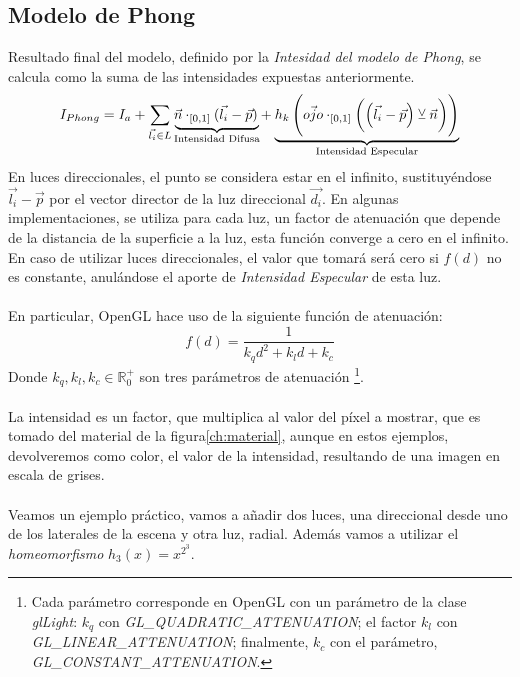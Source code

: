 \subsection{Modelo de Phong}
Resultado final del modelo, definido por la \textit{Intesidad del modelo de Phong}, se calcula como la suma de las intensidades expuestas anteriormente.
\[I_{Phong}=I_a+\sum_{\Vec{l_i}\in L} \mathrlap{\underbrace{\phantom{\Vec{n}\cdot_{[0, 1]}(\Vec{l_i}-\Vec{p})}}_{\text{Intensidad Difusa}}}\Vec{n}\cdot_{[0, 1]}(\Vec{l_i}-\Vec{p}) + \mathrlap{\underbrace{\phantom{h_k\left(\Vec{ojo}\cdot_{[0, 1]}\left(\left(\Vec{l_i}-\Vec{p}\right) \veebar \Vec{n}\right)\right)}}_{\text{Intensidad Especular}}}h_k\left(\Vec{ojo}\cdot_{[0, 1]}\left(\left(\Vec{l_i}-\Vec{p}\right) \veebar \Vec{n}\right)\right)\]
En luces direccionales, el punto se considera estar en el infinito, sustituyéndose \(\Vec{l_i}-\Vec{p}\) por el vector director de la luz direccional \(\Vec{d_i}\). En algunas implementaciones, se utiliza para cada luz, un factor de atenuación que depende de la distancia de la superficie a la luz, esta función converge a cero en el infinito. En caso de utilizar luces direccionales, el valor que tomará  será cero si \(f(d)\) no es constante, anulándose el aporte de \textit{Intensidad Especular} de esta luz.\\\\
En particular, OpenGL\cite{gllight} hace uso de la siguiente función de atenuación:
\[f(d)=\dfrac{1}{k_qd^2+k_ld+k_c}\]
Donde \(k_q,k_l,k_c \in \mathbb{R}^{+}_{0}\) son tres parámetros de atenuación \footnote{Cada parámetro corresponde en OpenGL con un parámetro de la clase \textit{glLight}: \(k_q\) con \textit{GL\_QUADRATIC\_ATTENUATION}; el factor \(k_l\) con \textit{GL\_LINEAR\_ATTENUATION}; finalmente, \(k_c\) con el parámetro, \textit{GL\_CONSTANT\_ATTENUATION}.}.\\\\
La intensidad es un factor, que multiplica al valor del píxel a mostrar, que es tomado del material de la figura\ref{ch:material}, aunque en estos ejemplos, devolveremos como color, el valor de la intensidad, resultando de una imagen en escala de grises.\\\\
Veamos un ejemplo práctico, vamos a añadir dos luces, una direccional desde uno de los laterales de la escena y otra luz, radial. Además vamos a utilizar el \textit{homeomorfismo} \(h_3(x)=x^{2^3}\).\\

